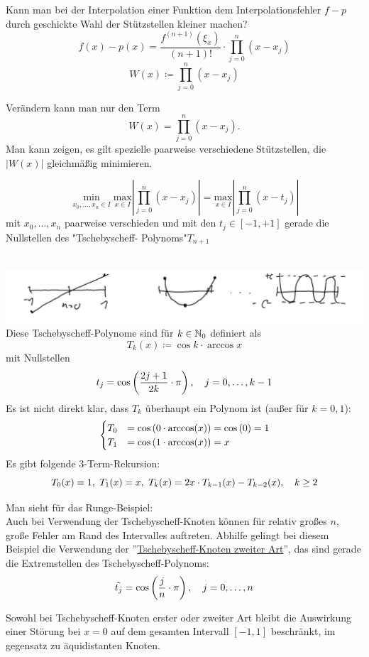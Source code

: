 \begin{question}
    Kann man bei der Interpolation einer Funktion dem Interpolationsfehler  $f-p$ durch geschickte Wahl der Stützstellen 
    kleiner machen?
    \[
f(x)-p(x)=\frac{f^{(n+1)}(\xi_x)}{(n+1)!}\cdot\prod^n_{j=0}(x-x_j)\]\[
W(x)\coloneqq \prod^n_{j=0}(x-x_j)
    \]
\end{question}
Verändern kann man nur den Term 
\[
W(x)= \prod^n_{j=0}(x-x_j).
\]
Man kann zeigen, es gilt spezielle paarweise verschiedene Stützstellen, die $|W(x)|$ gleichmäßig minimieren.\\
\begin{theorem}
    \[\underset{x_0,\dots,x_n\in I}{\min}\underset{x\in I}{\text{max}}\left|\prod^n_{j=0}(x-x_j) \right|=\underset{x\in 
    I}{\text{max}}\left|\prod^n_{j=0}(x-t_j) \right|\]
    mit $x_0,\dots,x_n$ paarweise verschieden und mit den $t_j\in [-1,+1]$ gerade die Nullstellen des "Tschebyscheff-
    Polynoms"\smallspace $T_{n+1}$\\
    
\end{theorem}
\begin{remark}\hfill\\
\includegraphics[width=\linewidth]{Bilder/abb1.png}
    Diese Tschebyscheff-Polynome sind für $k\in \mathbb{N}_0$ definiert als \[
    T_k(x)\coloneqq \cos{k\cdot \arccos{x}}
    \]
    mit Nullstellen \[
    t_j=\cos{\frac{2j+1}{2k}\cdot\pi}, \largespace j=0,\dots,k-1
    \]
    Es ist nicht direkt klar, dass $T_k$ überhaupt ein Polynom ist (außer für $k=0,1$):$$\\\begin{cases}
        T_0 &= \cos{0\cdot\arccos(x)} = \cos{0} = 1\\
        T_1 &= \cos{1\cdot\arccos(x)} = x
    \end{cases}$$
    Es gibt folgende 3-Term-Rekursion: \[
    T_0(x)\equiv 1, \ T_1(x) = x, \ T_k(x) = 2x\cdot T_{k-1}(x) - T_{k-2}(x), \hspace{1em} k\geq 2
    \]
\end{remark}
Man sieht für das Runge-Beispiel: \\
Auch bei Verwendung der Tschebyscheff-Knoten können für relativ großes $n$, große Fehler am Rand des Intervalles auftreten. 
Abhilfe gelingt bei diesem Beispiel die Verwendung der ''\underline{Tschebyscheff-Knoten zweiter Art}'', das sind gerade 
die Extremstellen des Tschebyscheff-Polynoms: \[
    \Tilde{t_j}=\cos{\frac{j}{n}\cdot \pi},\largespace j=0,\dots,n
\]
\begin{remark}
    Sowohl bei Tschebyscheff-Knoten erster oder zweiter Art bleibt die Auswirkung einer Störung bei $x=0$ auf dem gesamten
    Intervall $[-1,1]$ beschränkt, im gegensatz zu äquidistanten Knoten. 
\end{remark}

